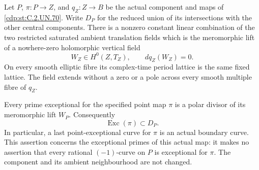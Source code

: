 
\begin{proposition}\label{cdp:st:C.2.UN.80}
Let \(P\), \(\pi:P\to Z\), and \(q_Z:Z\to B\) be the
actual component and maps of \ref{cdp:st:C.2.UN.70}. Write \(D_P\)
for the reduced union of its intersections with the
other central components. There is a nonzero constant
linear combination of the two restricted saturated
ambient translation fields which is the meromorphic
lift of a nowhere-zero holomorphic vertical field
\[
 W_Z\in H^0(Z,T_Z),\qquad dq_Z(W_Z)=0.
 \tag{C.EP.1}\label{cdp:eq:C.EP.1}
\]
On every smooth elliptic fibre its complex-time period
lattice is the same fixed lattice. The field extends
without a zero or a pole across every smooth multiple
fibre of \(q_Z\).

Every prime exceptional for the specified point map
\(\pi\) is a polar divisor of its meromorphic lift
\(W_P\). Consequently
\[
                 \operatorname{Exc}(\pi)\subset D_P.
 \tag{C.EP.2}\label{cdp:eq:C.EP.2}
\]
In particular, a last point-exceptional curve for
\(\pi\) is an actual boundary curve. This assertion
concerns the exceptional primes of this actual map:
it makes no assertion that every rational
\((-1)\)-curve on \(P\) is exceptional for \(\pi\).
The component and its ambient neighbourhood are not
changed.
\end{proposition}

